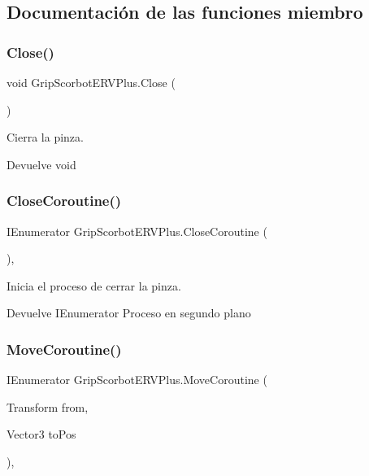 \subsection{Documentación de las funciones miembro}
\mbox{\label{class_grip_scorbot_e_r_v_plus_a40aaa4460e903237491daff0cd9e688e}} 
\subsubsection{\texorpdfstring{Close()}{Close()}}
{\footnotesize\ttfamily void Grip\+Scorbot\+E\+R\+V\+Plus.\+Close (\begin{DoxyParamCaption}{ }\end{DoxyParamCaption})\hspace{0.3cm}{\ttfamily [inline]}}

Cierra la pinza. \begin{DoxyReturn}{Devuelve}
void 
\end{DoxyReturn}
\mbox{\label{class_grip_scorbot_e_r_v_plus_acc36be3cd433bc005835c85aa9c6aa8f}} 
\subsubsection{\texorpdfstring{CloseCoroutine()}{CloseCoroutine()}}
{\footnotesize\ttfamily I\+Enumerator Grip\+Scorbot\+E\+R\+V\+Plus.\+Close\+Coroutine (\begin{DoxyParamCaption}{ }\end{DoxyParamCaption})\hspace{0.3cm}{\ttfamily [inline]}, {\ttfamily [private]}}

Inicia el proceso de cerrar la pinza. \begin{DoxyReturn}{Devuelve}
I\+Enumerator Proceso en segundo plano 
\end{DoxyReturn}
\mbox{\label{class_grip_scorbot_e_r_v_plus_aa15864ac05d2aaa60844cb715def5b35}} 
\subsubsection{\texorpdfstring{MoveCoroutine()}{MoveCoroutine()}}
{\footnotesize\ttfamily I\+Enumerator Grip\+Scorbot\+E\+R\+V\+Plus.\+Move\+Coroutine (\begin{DoxyParamCaption}\item[{Transform}]{from,  }\item[{Vector3}]{to\+Pos }\end{DoxyParamCaption})\hspace{0.3cm}{\ttfamily [inline]}, {\ttfamily [private]}}

